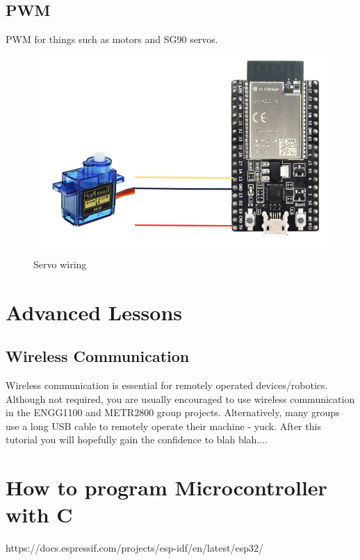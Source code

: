 \documentclass[a4paper,12pt]{report}
\begin{document}
\subsection*{PWM}
PWM for things such as motors and SG90 servos.
\begin{figure}[H]
  \centering
  \includegraphics[scale = 0.3]{servo.png}
  \caption{Servo wiring}
  \label{fig:servo}
\end{figure}
\section*{Advanced Lessons}
\subsection*{Wireless Communication}
Wireless communication is essential for remotely operated devices/robotics. 
Although not required, you are usually encouraged to use wireless 
communication in the ENGG1100 and METR2800 group projects.
Alternatively, many groups use a long USB cable to remotely operate their 
machine - yuck. After this tutorial you will hopefully gain the confidence to blah blah....

\section*{How to program Microcontroller with C}
https://docs.espressif.com/projects/esp-idf/en/latest/esp32/
\end{document}
